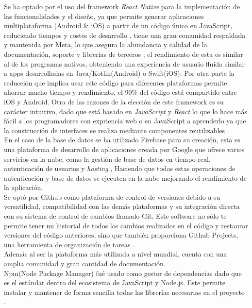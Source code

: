 \documentclass[12pt,a4paper]{report} %
\begin{document}
	Se ha optado por el uso del framework \textit{React Native} para la implementación de las funcionalidades y el diseño, ya que permite generar aplicaciones multiplataforma (Android \& iOS) a partir de un código único en JavaScript, reduciendo tiempos y costes de desarrollo \cite{reactNative}, tiene una gran comunidad respaldada y mantenida por Meta, lo que asegura la abundancia y calidad de la documentación, soporte y librerías de terceros \cite{reactNativeComnty}; el rendimiento de esta es similar al de los programas nativos, obteniendo una experiencia de usuario fluida similar a apps desarrolladas en Java/Kotlin(Android) o Swift(iOS)\cite{reactNativeRnd}. Por otra parte la reducción que implica usar este código para diferentes plataformas permite ahorrar mucho tiempo y rendimiento, el 90\% del código está compartido entre iOS y Android. Otra de las razones de la elección de este framework es su carácter intuitivo, dado que está basado en \textit{JavaScript} y \textit{React} lo que lo hace más fácil a los programadores con expriencia web o en JavaScript a aprenderlo ya que la construcción de interfaces se realiza mediante componentes reutilizables \cite{reactnative2025}.
	\\
	En el caso de la base de datos se ha utilizado Firebase para su creación, esta es una plataforma de desarrollo de aplicaciones creada por Google que ofrece varios servicios en la nube, como la gestión de base de datos en tiempo real, autenticación de usuarios y \textit{hosting} \cite{firebase}, Haciendo que todas estas operaciones de autenticación y base de datos se ejecuten en la nube mejorando el rendimiento de la aplicación.
	\\
	Se optó por Github como plataforma de control de versiones debido a su versatilidad, compatibilidad con las demás plataformas y su integración directa con su sistema de control de cambios llamado Git. Este software no sólo te permite tener un historial de todos los cambios realizados en el código y restaurar versiones del código anteriores, sino que también proporciona Github Projects, una herramienta de organización de tareas \cite{github2025}.\\
	Además al ser la plataforma más utilizada a nivel mundial, cuenta con una amplia comunidad y gran cantidad de documentación.
	\\
	Npm(Node Package Manager) fué usado como gestor de dependencias dado que es el estándar dentro del ecosistema de JavaScript y Node.js. Este permite instalar y mantener de forma sencilla todas las librerías necesarias en el proyecto \cite{npm2025}.
\end{document}
